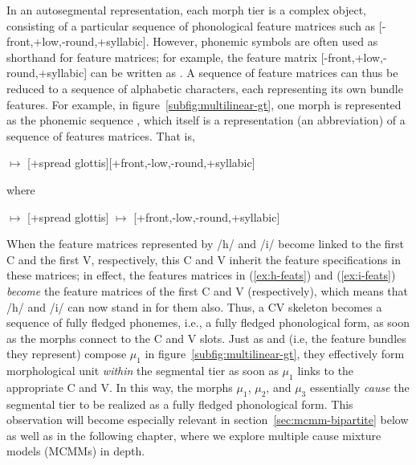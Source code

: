In an autosegmental representation, each morph tier is a complex object, consisting of a particular sequence of phonological feature matrices such as [-front,+low,-round,+syllabic]. However, phonemic symbols are often used as shorthand for
feature matrices; for example, the feature matrix [-front,+low,-round,+syllabic] can
be written as . A sequence of feature matrices can thus be 
reduced to a sequence of alphabetic characters, each representing its own 
bundle features. For example, in figure~\ref{subfig:multilinear-gt}, 
one morph is represented as the phonemic sequence , which itself is a representation (an abbreviation)
of a sequence of features matrices. That is, %
\begin{exe}
\ex {} \quad $\mapsto$ \quad \textipa{/}[+spread glottis][+front,-low,-round,+syllabic]\textipa{/}
\end{exe}
where 
\begin{exe} 
\ex  \label{ex:h-feats}  \quad $\mapsto$ \quad \textipa{/}[+spread glottis]\textipa{/}
\ex  \label{ex:i-feats}  \quad $\mapsto$ \quad \textipa{/}[+front,-low,-round,+syllabic]\textipa{/}
\end{exe}
When the feature matrices represented by /h/ and /i/ become linked to the first 
C and the first V, respectively, this C and V inherit the feature specifications in these matrices; in effect,
the features matrices in (\ref{ex:h-feats}) and (\ref{ex:i-feats}) \emph{become} the
feature matrices of the first C and V (respectively),
which means that /h/ and /i/ can now stand in for them also. %
Thus, a CV skeleton becomes a sequence of fully fledged phonemes, i.e., a fully fledged phonological
form, as soon as the morphs connect to the C and V slots. 
Just as  and  (i.e, the feature bundles they represent) compose 
$\mu_1$ in figure~\ref{subfig:multilinear-gt}, they effectively form morphological 
unit \emph{within} the segmental tier as soon as $\mu_1$ links to the appropriate C and V. In this way, the morphs $\mu_1$, $\mu_2$, and $\mu_3$ 
essentially \emph{cause} the segmental tier to be realized as a fully fledged 
phonological form. This observation will become especially relevant in 
section~\ref{sec:mcmm-bipartite} below as well as in the following chapter, where we explore multiple cause mixture models (MCMMs) in depth.

